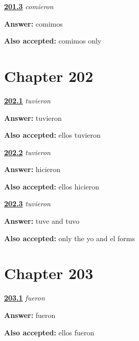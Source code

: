 \noindent\begin{minipage}[t]{\linewidth}
\raggedright
\hyperlink{review-ES-C55-comieron-contrast}{\textbf{201.3}} \emph{comieron}\par
\small \textbf{Answer:} comimos\par
\footnotesize \textbf{Also accepted:} comimos only
\end{minipage}\par\medskip

\section*{Chapter 202}

\noindent\begin{minipage}[t]{\linewidth}
\raggedright
\hyperlink{review-ES-C55-tuvieron-say}{\textbf{202.1}} \emph{tuvieron}\par
\small \textbf{Answer:} tuvieron\par
\footnotesize \textbf{Also accepted:} ellos tuvieron
\end{minipage}\par\medskip

\noindent\begin{minipage}[t]{\linewidth}
\raggedright
\hyperlink{review-ES-C55-tuvieron-build}{\textbf{202.2}} \emph{tuvieron}\par
\small \textbf{Answer:} hicieron\par
\footnotesize \textbf{Also accepted:} ellos hicieron
\end{minipage}\par\medskip

\noindent\begin{minipage}[t]{\linewidth}
\raggedright
\hyperlink{review-ES-C55-tuvieron-stress}{\textbf{202.3}} \emph{tuvieron}\par
\small \textbf{Answer:} tuve and tuvo\par
\footnotesize \textbf{Also accepted:} only the yo and el forms
\end{minipage}\par\medskip

\section*{Chapter 203}

\noindent\begin{minipage}[t]{\linewidth}
\raggedright
\hyperlink{review-ES-C55-fueron-say}{\textbf{203.1}} \emph{fueron}\par
\small \textbf{Answer:} fueron\par
\footnotesize \textbf{Also accepted:} ellos fueron
\end{minipage}\par\medskip

